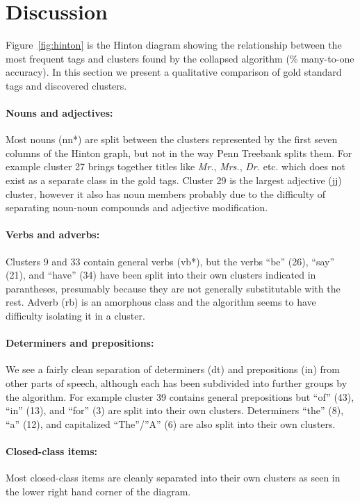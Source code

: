 \section{Discussion}
\label{sec:discussion}


Figure~\ref{fig:hinton} is the Hinton diagram showing the relationship
between the most frequent tags and clusters found by the collapsed
algorithm (\collapseResult\% many-to-one accuracy).  In this section
we present a qualitative comparison of gold standard tags and
discovered clusters.

\paragraph{Nouns and adjectives:} Most nouns ({\sc nn*}) are split between the
clusters represented by the first seven columns of the Hinton graph,
but not in the way Penn Treebank splits them.  For example cluster 27
brings together titles like {\em Mr.}, {\em Mrs.}, {\em Dr.}
etc. which does not exist as a separate class in the gold tags.
Cluster 29 is the largest adjective ({\sc jj}) cluster, however it
also has noun members probably due to the difficulty of separating
noun-noun compounds and adjective modification.

\paragraph{Verbs and adverbs:}  Clusters 9 and 33 contain general
verbs ({\sc vb*}), but the verbs ``be'' (26), ``say'' (21), and
``have'' (34) have been split into their own clusters indicated in
parantheses, presumably because they are not generally substitutable
with the rest.  Adverb ({\sc rb}) is an amorphous class and the
algorithm seems to have difficulty isolating it in a cluster.

\paragraph{Determiners and prepositions:}  We see a fairly clean
separation of determiners ({\sc dt}) and prepositions ({\sc in}) from
other parts of speech, although each has been subdivided into further
groups by the algorithm.  For example cluster 39 contains general
prepositions but ``of'' (43), ``in'' (13), and ``for'' (3) are split
into their own clusters.  Determiners ``the'' (8), ``a'' (12), and
capitalized ``The''/''A'' (6) are also split into their own clusters.

\paragraph{Closed-class items:}  Most closed-class items are cleanly
separated into their own clusters as seen in the lower right hand
corner of the diagram.
